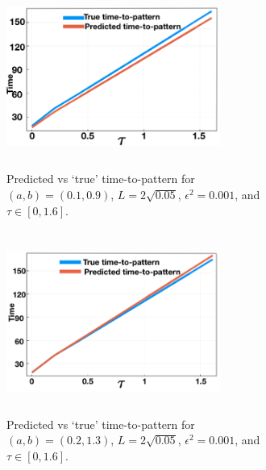 \begin{figure}[H]
    \centering
    \begin{subfigure}[b]{0.45\textwidth}
        \centering
        \includegraphics[width=7cm,height=6cm]{ttp2.png}
        \caption{Predicted vs `true' time-to-pattern for $(a,b)=(0.1,0.9)$, $L=2\sqrt{0.05}$, $\epsilon^2=0.001$, and $\tau\in[0,1.6]$.}
        \label{fig:ttp2}
    \end{subfigure}
    \hfill
    \begin{subfigure}[b]{0.45\textwidth}
        \centering
        \includegraphics[width=7cm,height=6cm]{ttp3.png}
        \caption{Predicted vs `true' time-to-pattern for $(a,b)=(0.2,1.3)$, $L=2\sqrt{0.05}$, $\epsilon^2=0.001$, and $\tau\in[0,1.6]$.}
        \label{fig:ttp3}
    \end{subfigure}
    \caption{}
    \label{}
\end{figure}

